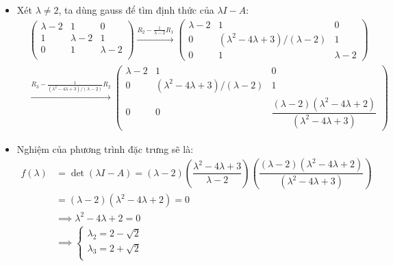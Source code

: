 \documentclass[a4paper, 12pt]{report}
\begin{document}
\begin{itemize}
    \item Xét $\lambda \neq 2$, ta dùng gauss để tìm định thức của $\lambda I - A$:
    $$
    \begin{aligned}
    &\begin{pmatrix}
        \lambda - 2 & 1 & 0 \\
        1 & \lambda - 2 & 1 \\
        0 & 1 & \lambda - 2 \\
    \end{pmatrix}
    \xrightarrow{R_2 - \frac{1}{\lambda - 2}R_1}
    \begin{pmatrix}
        \lambda - 2 & 1 & 0 \\ 
        0 & (\lambda^2 - 4\lambda + 3) / (\lambda - 2) & 1 \\
        0 & 1 & \lambda - 2
    \end{pmatrix} \\
    &\xrightarrow{R_3 - \frac{1}{(\lambda^2 - 4\lambda + 3) / (\lambda - 2)}R_2}
    \begin{pmatrix}
        \lambda - 2 & 1 & 0 \\ 
        0 & (\lambda^2 - 4\lambda + 3) / (\lambda - 2) & 1 \\
        0 & 0 & \dfrac{(\lambda - 2)(\lambda^2 - 4 \lambda + 2)}{(\lambda^2 - 4 \lambda + 3)}
    \end{pmatrix}
    \end{aligned}
    $$

    \item Nghiệm của phương trình đặc trưng sẽ là:
    $$
    \begin{aligned}
    f(\lambda) &= \det(\lambda I - A) = (\lambda-2) \left( \dfrac{\lambda^2 - 4\lambda + 3}{\lambda - 2} \right) \left( \dfrac{(\lambda - 2)(\lambda^2 - 4 \lambda + 2)}{(\lambda^2 - 4 \lambda + 3)} \right) \\
    &= (\lambda - 2)(\lambda^2 - 4\lambda + 2) = 0 \\
    &\implies \lambda^2 - 4\lambda + 2 = 0 \\
    &\implies 
    \begin{cases}
        \lambda_2 = 2 - \sqrt{2} \\
        \lambda_3 = 2 + \sqrt{2} \\
    \end{cases}
    \end{aligned}
    $$


\end{itemize}
\end{document}
